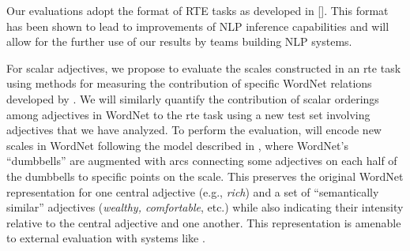 \documentclass[10pt]{article}
\begin{document}
\vspace {-3mm}

Our evaluations adopt the format of RTE tasks as developed in [\cite{pascal}]. This format has been shown to lead to improvements of NLP inference capabilities and will allow for the further use of our results by teams building NLP systems. 

For scalar adjectives, we propose to evaluate the scales constructed in an {\sc rte} task using methods for measuring the contribution of specific WordNet relations developed by \cite{clark2008using,clark2008augmenting,clark2007role}. 
We will similarly quantify the contribution of scalar orderings among adjectives in WordNet to the {\sc rte} task using a new test set involving adjectives that we have analyzed. 
To perform the evaluation, will encode new scales in WordNet following the model described in 
\cite{sheinmanetal2013}, where WordNet's ``dumbbells'' are augmented with arcs connecting some  adjectives on each half of the dumbbells to specific 
points on the scale. This preserves the original WordNet representation for one central 
adjective (e.g., \emph{rich}) and a set of ``semantically similar'' adjectives (\emph{wealthy, comfortable}, etc.) while also indicating their intensity relative to the central adjective and one another.
This representation is amenable to external evaluation with systems like \cite{clark2007role}.


\end{document}
